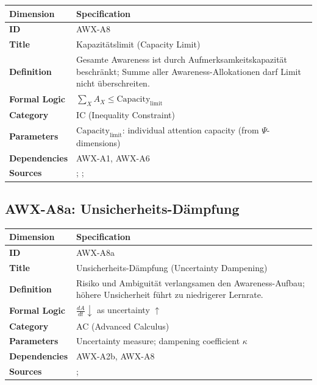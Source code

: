 \begin{table}[htbp]
\small
\begin{tabular}{p{3cm}p{11cm}}
\toprule
\textbf{Dimension} & \textbf{Specification} \\
\midrule
\textbf{ID} & AWX-A8 \\
\textbf{Title} & Kapazitätslimit (Capacity Limit) \\
\textbf{Definition} & Gesamte Awareness ist durch Aufmerksamkeitskapazität beschränkt; Summe aller Awareness-Allokationen darf Limit nicht überschreiten. \\
\textbf{Formal Logic} & $\sum_X A_X \leq \text{Capacity}_{\text{limit}}$ \\
\textbf{Category} & IC (Inequality Constraint) \\
\textbf{Parameters} & $\text{Capacity}_{\text{limit}}$: individual attention capacity (from $\Psi$-dimensions) \\
\textbf{Dependencies} & AWX-A1, AWX-A6 \\
\textbf{Sources} & \citet{PAP-simon1955behavioral}; \citet{PAP-kahneman2003maps}; \citet{sims2003implications} \\
\bottomrule
\end{tabular}
\end{table}


\subsection{AWX-A8a: Unsicherheits-Dämpfung}

\begin{table}[htbp]
\small
\begin{tabular}{p{3cm}p{11cm}}
\toprule
\textbf{Dimension} & \textbf{Specification} \\
\midrule
\textbf{ID} & AWX-A8a \\
\textbf{Title} & Unsicherheits-Dämpfung (Uncertainty Dampening) \\
\textbf{Definition} & Risiko und Ambiguität verlangsamen den Awareness-Aufbau; höhere Unsicherheit führt zu niedrigerer Lernrate. \\
\textbf{Formal Logic} & $\frac{dA}{dt} \downarrow$ as uncertainty $\uparrow$ \\
\textbf{Category} & AC (Advanced Calculus) \\
\textbf{Parameters} & Uncertainty measure; dampening coefficient $\kappa$ \\
\textbf{Dependencies} & AWX-A2b, AWX-A8 \\
\textbf{Sources} & \citet{ellsberg1961risk}; \citet{camerer1992recent} \\
\bottomrule
\end{tabular}
\end{table}

